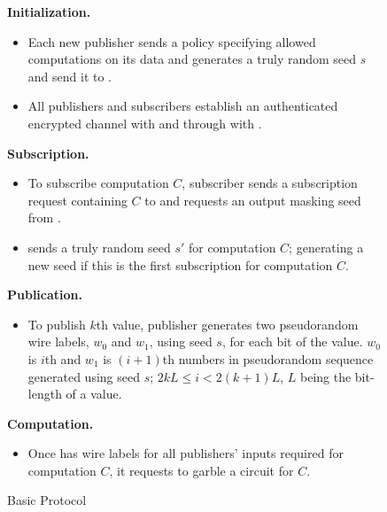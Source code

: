 \begin{figure}[h]
	\caption{Basic Protocol}
\label{fig:basicprotocol}
\begin{mdframed}[style=myframe]

\textbf{Initialization.}
\begin{itemize}[leftmargin=*]
 
	\item Each new publisher sends \broker a policy specifying allowed
		computations on its data and generates a truly random seed $s$ and send
		it to \garbler.

	\item All publishers and subscribers establish an authenticated encrypted
		channel with \broker and through \broker with \garbler.

\end{itemize}

\textbf{Subscription.}
\begin{itemize}[leftmargin=*]

	\item To subscribe computation $C$, subscriber sends a subscription request
	  containing $C$ to \broker and requests an output masking seed from
	  \garbler.

	\item \garbler sends a truly random seed $s'$ for computation $C$; generating
		a new seed if this is the first subscription for computation $C$.

\end{itemize}

\textbf{Publication.}
\begin{itemize}[leftmargin=*]
		
	\item To publish $k$th value, publisher generates two pseudorandom wire
		labels, $w_0$ and $w_1$, using seed $s$, for each bit of the value.  $w_0$
		is $i$th and $w_1$ is $(i+1)$th numbers in pseudorandom sequence generated
		using seed $s$; $2kL \leq i < 2(k+1)L$, $L$ being the bit-length of a
		value.

\end{itemize}

\textbf{Computation.}
\begin{itemize}[leftmargin=*]

	\item Once \broker has wire labels for all publishers' inputs required for
		computation $C$, it requests \garbler to garble a circuit for $C$.  
  

\end{itemize}
\end{mdframed}
\end{figure}
